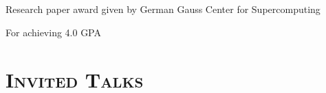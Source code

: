\begin{resume}
	\begin{formatb}
		\\
		\body\\
	\end{formatb}

  \begin{position}
    Research paper award given by German Gauss Center for Supercomputing
  \end{position}

	
	
	
	
	
	\begin{position}
		For achieving 4.0 GPA
	\end{position}
	


  \section{\textsc{Invited Talks}}


\end{resume}
